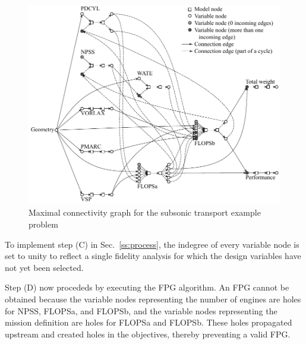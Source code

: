 	\begin{figure}[htb!]
	  \begin{center}
		\includegraphics[width=6in]{images/MCG_edit_holes}
	  \end{center}
	  \caption{Maximal connectivity graph for the subsonic transport example problem}
	\label{f:MCG holes}
	\end{figure}

To implement step (C) in Sec.~\ref{ss:process}, the indegree of every variable node is set to unity to reflect a single fidelity analysis for which the design variables have not yet been selected.


%

Step (D) now procededs by executing the FPG algorithm. An FPG cannot be obtained because the variable nodes representing the number of engines are holes for NPSS, FLOPSa, and FLOPSb, and the variable nodes representing the mission definition are holes for FLOPSa and FLOPSb. These holes propagated upstream and created holes in the objectives, thereby preventing a valid FPG.


